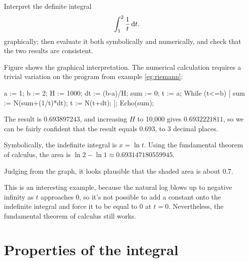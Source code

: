 \begin{eg}\label{eg:hyperbola}
\egquestion Interpret the definite integral
\begin{equation*}
  \int_{1}^{2} \frac{1}{t}\operatorname{d\!} t.
\end{equation*}
graphically; then evaluate it both symbolically and numerically, and check that the two results
are consistent.


\eganswer Figure  shows the graphical interpretation. The numerical calculation
requires a trivial variation on the program from example \ref{eg:riemann}:

\restartLineNumbers
\begin{Code}
  a := 1;
  b := 2;
  H := 1000;
  dt := (b-a)/H;
  sum := 0;
  t := a;
  While (t<=b) [
    sum := N(sum+(1/t)*dt);
    t := N(t+dt);
  ];
  Echo(sum);
\end{Code}
The result is $0.693897243$, and increasing $H$ to 10,000 gives $0.6932221811$, so we can be fairly confident that
the result equals $0.693$, to 3 decimal places.

Symbolically, the indefinite integral is $x=\ln t$. Using the fundamental theorem of calculus, the area
is $\ln 2-\ln 1\approx 0.693147180559945$.

Judging from the graph, it looks plausible that the shaded area is about 0.7.

This is an interesting example, because the natural log blows up to negative infinity as $t$ approaches 0,
so it's not possible to add a constant onto the indefinite integral and force it to be equal to
0 at $t=0$. Nevertheless, the fundamental theorem of calculus still works.

\end{eg}


\section{Properties of the integral}

